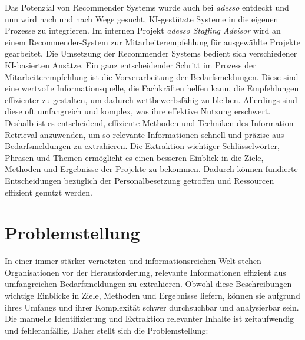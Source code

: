 \documentclass[a4paper,12pt]{scrreprt}
\newcommand{\hiddenchapter}[1]{
	\chapter*{{#1}}
}
\begin{document}
Das Potenzial von Recommender Systems wurde auch bei \emph{adesso} entdeckt und nun wird nach und nach Wege gesucht, KI-gestützte Systeme in die eigenen Prozesse zu integrieren. Im internen Projekt \emph{adesso Staffing Advisor} wird an einem Recommender-System zur Mitarbeiterempfehlung für ausgewählte Projekte gearbeitet. Die Umsetzung der Recommender Systems bedient sich verschiedener KI-basierten Ansätze. Ein ganz entscheidender Schritt im Prozess der Mitarbeiterempfehlung ist die Vorverarbeitung der Bedarfsmeldungen. Diese sind eine wertvolle Informationsquelle, die Fachkräften helfen kann, die Empfehlungen effizienter zu gestalten, um dadurch wettbewerbsfähig zu bleiben. Allerdings sind diese oft umfangreich und komplex, was ihre effektive Nutzung erschwert.\\

Deshalb ist es entscheidend, effiziente Methoden und Techniken des Information Retrieval anzuwenden, um so relevante Informationen schnell und präzise aus Bedarfsmeldungen zu extrahieren. Die Extraktion wichtiger Schlüsselwörter, Phrasen und Themen ermöglicht es einen besseren Einblick in die Ziele, Methoden und Ergebnisse der Projekte zu bekommen. Dadurch können fundierte Entscheidungen bezüglich der Personalbesetzung getroffen und Ressourcen effizient genutzt werden.\\
\hiddenchapter{Problemstellung}
In einer immer stärker vernetzten und informationsreichen Welt stehen Organisationen vor der Herausforderung, relevante Informationen effizient aus umfangreichen Bedarfsmeldungen zu extrahieren. Obwohl diese Beschreibungen wichtige Einblicke in Ziele, Methoden und Ergebnisse liefern, können sie aufgrund ihres Umfangs und ihrer Komplexität schwer durchsuchbar und analysierbar sein. Die manuelle Identifizierung und Extraktion relevanter Inhalte ist zeitaufwendig und fehleranfällig. Daher stellt sich die Problemstellung: \\
\end{document}

